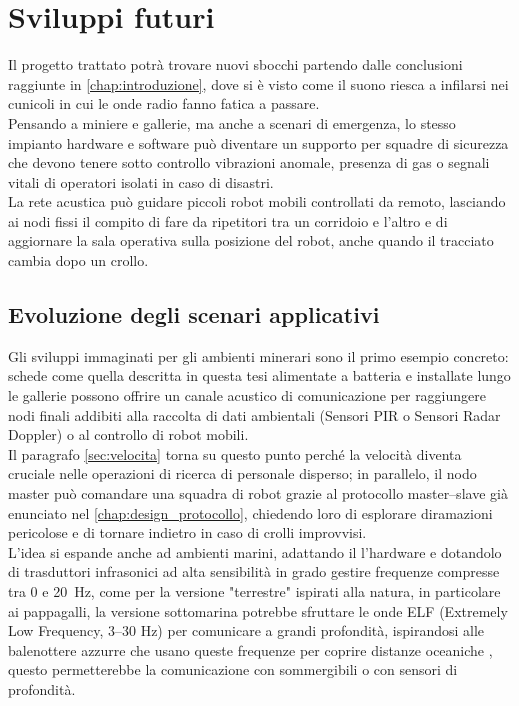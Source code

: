 \chapter{Sviluppi futuri}
\label{chap:sviluppi_futuri}

Il progetto trattato potrà trovare nuovi sbocchi partendo dalle conclusioni raggiunte in \autoref{chap:introduzione},
 dove si è visto come il suono riesca a infilarsi nei cunicoli in cui le onde radio fanno fatica a passare.\\ 
Pensando a miniere e gallerie, ma anche a scenari di emergenza, lo stesso impianto hardware e software può diventare un supporto
 per squadre di sicurezza che devono tenere sotto controllo vibrazioni anomale, presenza di gas o segnali vitali di operatori isolati in caso di disastri.  \\
La rete acustica può guidare piccoli robot mobili controllati da remoto, lasciando ai nodi fissi il compito di fare da ripetitori tra un corridoio
 e l'altro e di aggiornare la sala operativa sulla posizione del robot, anche quando il tracciato cambia dopo un crollo.

\section{Evoluzione degli scenari applicativi}
\label{sec:scenari_applicativi}

Gli sviluppi immaginati per gli ambienti minerari sono il primo esempio concreto: schede come quella descritta in questa tesi alimentate a batteria e installate 
lungo le gallerie possono offrire un canale acustico di comunicazione per raggiungere nodi finali addibiti alla raccolta di dati ambientali (Sensori PIR o Sensori Radar Doppler)
 o al controllo di robot mobili. \\
 Il paragrafo \autoref{sec:velocita} torna su questo punto perché la velocità diventa cruciale nelle operazioni di ricerca di personale disperso;
  in parallelo, il nodo master può comandare una squadra di robot grazie al protocollo master--slave già enunciato nel \autoref{chap:design_protocollo},
   chiedendo loro di esplorare diramazioni pericolose e di tornare indietro in caso di crolli improvvisi. \\

L'idea si espande anche ad ambienti marini, adattando il l'hardware e dotandolo di trasduttori infrasonici ad alta sensibilità in grado 
gestire frequenze compresse tra 0 e \SI{20}{\hertz}, come per la versione "terrestre" ispirati alla natura, in particolare ai pappagalli, la versione sottomarina
potrebbe sfruttare le onde ELF (Extremely Low Frequency, 3--30 Hz) per comunicare a grandi profondità, ispirandosi alle balenottere azzurre che 
usano queste frequenze per coprire distanze oceaniche \citep{Dziak2017}, questo permetterebbe la comunicazione con sommergibili o con sensori di profondità. \\

